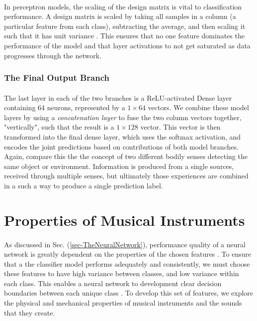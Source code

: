 \documentclass[12pt,letterpaper]{article}
\begin{document}
\paragraph*{}In perceptron models, the scaling of the design matrix is vital to classification performance. A design matrix is scaled by taking all samples in a column (a particular feature from each class), subtracting the average, and then scaling it such that it has unit variance \cite{Geron,James}. This ensures that no one feature dominates the performance of the model and that layer activations to not get saturated as data progresses through the network.


\subsubsection{The Final Output Branch}

\paragraph*{}The last layer in each of the two branches is a ReLU-activated Dense layer containing 64 neurons, represented by a $1 \times 64$ vectors. We combine these model layers by using a \textit{concatenation layer} to fuse the two column vectors together, "vertically", such that the result is a $1 \times 128$ vector. This vector is then transformed into the final dense layer, which uses the softmax activation, and encodes the joint predictions based on contributions of both model branches. Again, compare this the the concept of two different bodily senses detecting the same object or environment. Information is produced from a single sources, received through multiple senses, but ultimately those experiences are combined in a such a way to produce a single prediction label.


\newpage
\section{Properties of Musical Instruments}
\label{sec-Instruments}

\paragraph*{}As discussed in Sec. (\ref{sec-TheNeuralNetwork}), performance quality of a neural network is greatly dependent on the properties of the chosen features \cite{Virtanen,Liu}. To ensure that a the classifier model performs adequately and consistently, we must choose these features to have high variance between classes, and low variance within each class. This enables a neural network to development clear decision boundaries between each unique class \cite{James,Serizel}. To develop this set of features, we explore the physical and mechanical properties of musical instruments and the sounds that they create.
\end{document}
